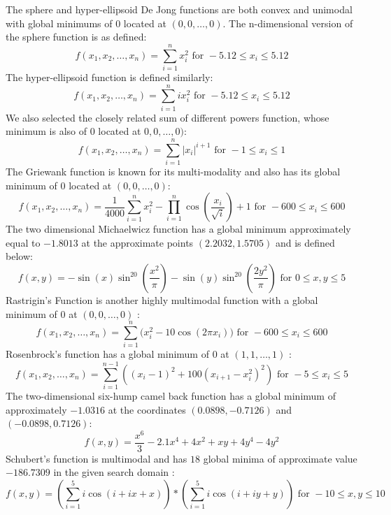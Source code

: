%
%
The sphere and hyper-ellipsoid De Jong functions are both convex and unimodal with global minimums of $0$ located at $(0,0,\ldots,0)$. The n-dimensional version of the sphere function is as defined\cite{molga05,yang10}:
\[ f(x_1,x_2,\ldots,x_n) = \sum\limits_{i=1}^n x_i^2 \text{ for } -5.12 \leq x_i \leq 5.12 \]
%
%
The hyper-ellipsoid function is defined similarly\cite{molga05,yang10}:
\[ f(x_1,x_2,\ldots,x_n) = \sum\limits_{i=1}^n ix_i^2 \text{ for } -5.12 \leq x_i \leq 5.12\]
%
%
We also selected the closely related sum of different powers function, whose minimum is also of $0$ located at $0,0,\ldots,0)$\cite{molga05,yang10}:
\[ f(x_1,x_2,\ldots,x_n) = \sum\limits_{i=1}^n |x_i|^{i+1} \text{ for } -1 \leq x_i \leq 1\]
%
%
The Griewank function is known for its multi-modality and also has its global minimum of $0$ located at $(0,0,\ldots,0)$\cite{molga05,yang10}:
 \[ f(x_1,x_2,\ldots,x_n) = \frac{1}{4000}\sum\limits_{i=1}^n x_i^{2} - \prod\limits_{i=1}^{n} \cos(\frac{x_i}{\sqrt{i}})+1 \text{ for } -600 \leq x_i \leq 600\]
 The two dimensional Michaelwicz function has a global minimum approximately equal to $-1.8013$ at the approximate points $(2.2032,1.5705)$ and is defined below\cite{molga05,yang10}:
 \[ f(x,y) = -\sin(x)\sin^{20}(\frac{x^2}{\pi}) - \sin(y)\sin^{20}(\frac{2y^2}{\pi}) \text{ for } 0 \leq x,y \leq 5\]
 Rastrigin's Function is another highly multimodal function with a global minimum of $0$ at $(0,0,\ldots,0)$ \cite{molga05,yang10}:
 \[f(x_1,x_2,\ldots,x_n) = \sum\limits_{i=1}^n \big( x_i^2 - 10\cos(2\pi x_i) \big)\text{ for } -600 \leq x_i \leq 600\]
 Rosenbrock's function has a global minimum of 0 at $(1,1,\ldots,1)$ \cite{molga05,yang10}:
 \[f(x_1,x_2,\ldots,x_n) = \sum\limits_{i=1}^{n-1} ((x_i-1)^2 + 100(x_{i+1}-x_i^2)^2) \text{ for } -5 \leq x_i \leq 5\]
 The two-dimensional six-hump camel back function has a global minimum of approximately $-1.0316$ at the coordinates $(0.0898,-0.7126)$ and $(-0.0898,0.7126)$\cite{molga05,yang10}:
 \[f(x,y) = \frac{x^6}{3}-2.1x^4+4x^2+xy+4y^4-4y^2 \]
 Schubert's function is multimodal and has $18$ global minima of approximate value $-186.7309$ in the given search domain \cite{molga05,yang10}:
 \[ f(x,y) = (\sum\limits_{i=1}^{5} i\cos(i + ix + x)) * (\sum\limits_{i=1}^{5} i\cos(i + iy + y)) \text{ for } -10 \leq x,y \leq 10 \]
 

